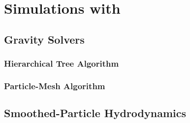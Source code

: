 
\section{Simulations with \gadget}
\label{sec:gadget}



\subsection{Gravity Solvers}


\subsubsection{Hierarchical Tree Algorithm}


\subsubsection{Particle-Mesh Algorithm}



\subsection{Smoothed-Particle Hydrodynamics}



